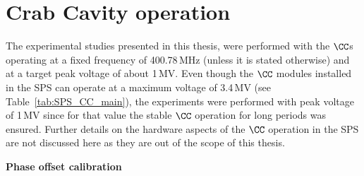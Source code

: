 
\section{Crab Cavity operation}\label{sec:cc_setup}
The experimental studies presented in this thesis, were performed with the $\CC$s operating at a fixed frequency of 400.78\,MHz (unless it is stated otherwise) and at a target peak voltage of about 1\,MV. %
Even though the $\CC$ modules installed in the SPS can operate at a maximum voltage of 3.4\,MV (see Table~\ref{tab:SPS_CC_main}), the experiments were performed with peak voltage of 1\,MV since for that value the stable $\CC$ operation for long periods was ensured. Further details on the hardware aspects of the $\CC$ operation in the SPS are not discussed here as they are out of the scope of this thesis.



\normalsize{\textbf{Phase offset calibration}}\\






